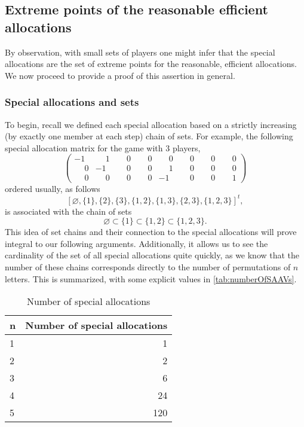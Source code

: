 \documentclass[12pt,letterpaper,final]{article}
\theoremstyle{plain}
\theoremstyle{plain}
\theoremstyle{plain}
\theoremstyle{plain}
\theoremstyle{plain}
\theoremstyle{plain}
\theoremstyle{plain}
\theoremstyle{definition}
\theoremstyle{definition}
\theoremstyle{definition}
\theoremstyle{definition}
\theoremstyle{definition}
\theoremstyle{remark}
\theoremstyle{remark}
\theoremstyle{remark}
\theoremstyle{remark}
\newcommand{\p}{\phantom{-}}
\begin{document}
\subsection{Extreme points of the reasonable efficient allocations}
By observation, with small sets of players one might infer that the
special allocations are the set of extreme points for the reasonable,
efficient allocations. We now
proceed to provide a proof of this assertion in general.

\subsubsection{Special allocations and sets}
\label{sec:saav-sets}

To begin, recall we defined each special allocation based on a
strictly increasing (by exactly one member at each step) chain of
sets. For example, the
following special allocation matrix for the game with \(3\) players,
\[
  \begin{pmatrix}
    -1&\p1&\p0&\p0&\p0&\p0&\p0&\p0\\
    \p0&-1&\p0&\p0&\p1&\p0&\p0&\p0\\
    \p0&\p0&\p0&\p0&-1&\p0&\p0&\p1
  \end{pmatrix}
\]
ordered usually, as follows
\[
  {\left[
    \varnothing , \{1\}, \{2\}, \{3\}, \{1,2\}, \{1,3\}, \{2,3\}, \{1,2,3\}
  \right]}^t,
\]
is associated with the chain of sets
\begin{equation*}
  \varnothing \subset \{1\} \subset \{1,2\} \subset \{1,2,3\}.
\end{equation*}
This idea of set chains and their connection to the special allocations will prove
integral to our following arguments. 
Additionally, it allows us to see the cardinality of the set of all
special allocations quite
quickly, as we know that the number of these chains corresponds
directly to the number of permutations of \(n\) letters. This is
summarized, with some explicit values in \vref{tab:numberOfSAAVs}.
\begin{table}
  \centering
  \caption{Number of special allocations}\label{tab:numberOfSAAVs}
  \begin{tabular}{lr}
    \toprule
    n & Number of special allocations\\
    \midrule
    1 & 1\\
    2 & 2\\
    3 & 6\\
    4 & 24\\
    5 & 120\\
    \bottomrule
  \end{tabular}
\end{table}
\end{document}
